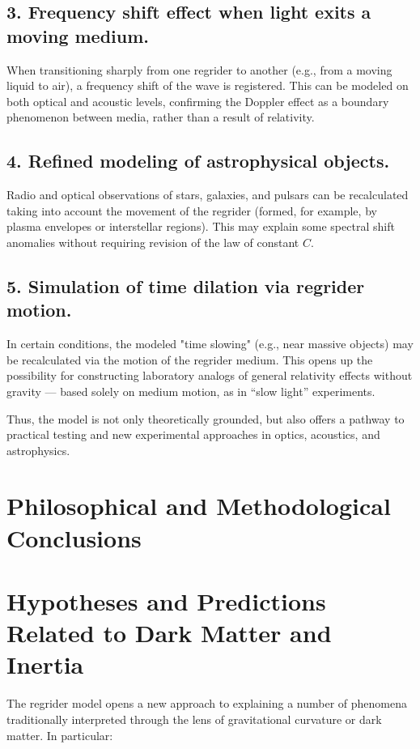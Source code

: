 \documentclass[12pt]{article}
\begin{document}
\subsection*{3. Frequency shift effect when light exits a moving medium.}
When transitioning sharply from one regrider to another (e.g., from a moving liquid to air), a frequency shift of the wave is registered. This can be modeled on both optical and acoustic levels, confirming the Doppler effect as a boundary phenomenon between media, rather than a result of relativity.

\subsection*{4. Refined modeling of astrophysical objects.}
Radio and optical observations of stars, galaxies, and pulsars can be recalculated taking into account the movement of the regrider (formed, for example, by plasma envelopes or interstellar regions). This may explain some spectral shift anomalies without requiring revision of the law of constant $C$.

\subsection*{5. Simulation of time dilation via regrider motion.}
In certain conditions, the modeled "time slowing" (e.g., near massive objects) may be recalculated via the motion of the regrider medium. This opens up the possibility for constructing laboratory analogs of general relativity effects without gravity — based solely on medium motion, as in “slow light” experiments.

Thus, the model is not only theoretically grounded, but also offers a pathway to practical testing and new experimental approaches in optics, acoustics, and astrophysics.

\section*{Philosophical and Methodological Conclusions}
\section*{Hypotheses and Predictions Related to Dark Matter and Inertia}

The regrider model opens a new approach to explaining a number of phenomena traditionally interpreted through the lens of gravitational curvature or dark matter. In particular:
\end{document}
